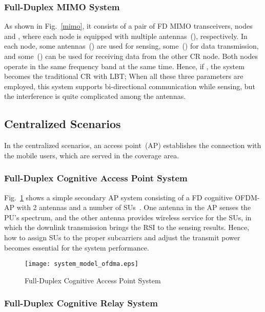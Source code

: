 \documentclass[onecolumn,12pt]{IEEEtran}
\begin{document}
\subsubsection{Full-Duplex MIMO System}
 As shown in Fig.~\ref{mimo}, it consists of a pair of FD MIMO transceivers, nodes  and  , where each node is equipped with multiple antennas~(), respectively. In each node, some antennas~() are used for sensing, some~() for data transmission, and some~() can be used for receiving data from the other CR node. Both nodes operate in the same frequency band at the same time. Hence, if , the system becomes the traditional CR with LBT; When all these three parameters are employed, this system supports bi-directional communication while sensing, but the interference is quite complicated among the antennas.



\subsection{Centralized Scenarios}
In the centralized scenarios, an access point~(AP) establishes the connection with the mobile users, which are served in the coverage area.
\subsubsection{Full-Duplex Cognitive Access Point System}



Fig.~\ref{ofdma} shows a simple secondary AP system consisting of a FD cognitive OFDM-AP with 2 antennas and a number of SUs~\cite{Wang2015icc}. One antenna in the AP senses the PU's spectrum, and the other antenna provides wireless service for the SUs, in which the downlink transmission brings the RSI to the sensing results. Hence, how to assign SUs to the proper subcarriers and adjust the transmit power becomes essential for the system performance.

\begin{figure}[ht]
\begin{center}
\centerline{\texttt{[image: system\_model\_ofdma.eps]}}
\caption{Full-Duplex Cognitive Access Point System} \label{ofdma}
\end{center}
\end{figure}

\subsubsection{Full-Duplex Cognitive Relay System}
\end{document}
